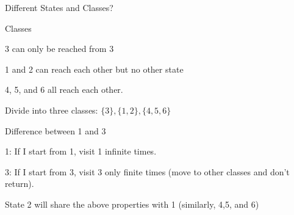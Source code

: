 \begin{frame}{Different States and Classes?}

{
\small
\plitemsep 0.05in
\bci
\item Classes
\bci
\item<2-> 3 can only be reached from 3
\item<3-> 1 and 2 can reach each other but no other state
\item<4-> 4, 5, and 6 all reach each other.
\item<5-> Divide into three classes: $\{ 3\}, \{1,2 \}, \{4,5,6 \}$
\item<6->  
\eci
\eci
}
{
\vspace{-0.5cm}
\begin{center}
\end{center}
}

\small
\plitemsep 0.05in
\bci
\item<7-> Difference between 1 and 3
\bci
\item<8-> 1: If I start from 1, visit 1 infinite times.
\item<9-> 3: If I start from 3, visit 3 only finite times (move to other classes and don't return). 
\item<10->  
\eci

\item<11-> State 2 will share the above properties with 1 (similarly, 4,5, and 6)
\item<12->  
\eci
\end{frame}

